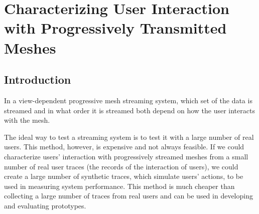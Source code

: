 \chapter{Characterizing User Interaction with Progressively Transmitted Meshes}
\label{c:user}
\section{Introduction}
In a view-dependent progressive mesh streaming system, which set of the data is streamed
and in what order it is streamed both depend on how the user interacts with the mesh. 



The ideal way to test a streaming system is to 
test it with a large number of real users. This method, however, is expensive 
and not always feasible. If we could characterize users' interaction with
progressively streamed meshes from a small number of real user traces
(the records of the interaction of users), 
we could create a large number of synthetic traces,
which simulate users' actions, to be used in measuring system performance. 
This method is much cheaper than collecting a large number of traces from real users
and can be used in developing and evaluating
prototypes. 



